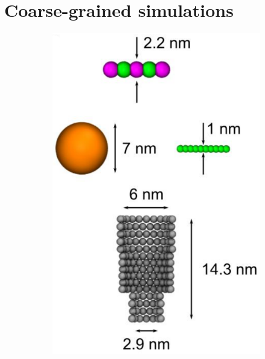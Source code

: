 \section{Coarse-grained simulations}

\begin{figure}[ht]
  \begin{centering}
  \begin{subfigure}[t]{\dimexpr.4\linewidth-1.3em\relax}
  \centering
  \includegraphics[width=0.9\linewidth,valign=t]{Figures/Stefanos1.png}
  \end{subfigure}%
  \begin{subfigure}[t]{\dimexpr.5\linewidth-1.3em\relax}
  \centering

\end{subfigure}
\end{centering}
\end{figure}
